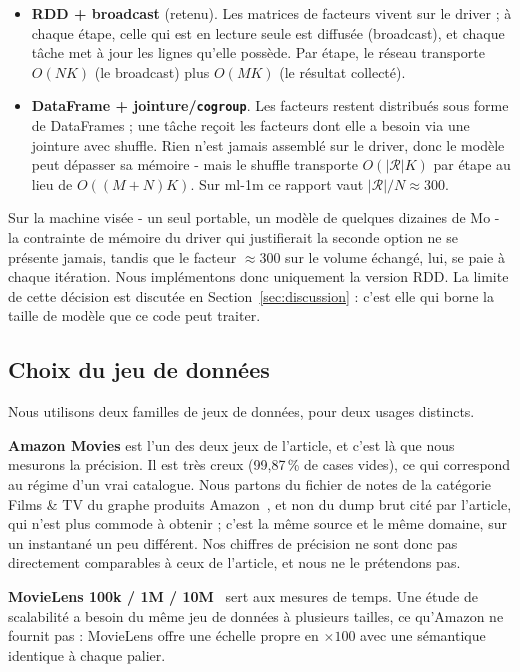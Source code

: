 \documentclass[11pt,a4paper]{article}
\begin{document}
\begin{itemize}\itemsep2pt
\item \textbf{RDD + broadcast} (retenu). Les matrices de facteurs vivent sur le driver ;
à chaque étape, celle qui est en lecture seule est diffusée (broadcast), et chaque tâche
met à jour les lignes qu'elle possède. Par étape, le réseau transporte $O(NK)$ (le
broadcast) plus $O(MK)$ (le résultat collecté).
\item \textbf{DataFrame + jointure/\texttt{cogroup}}. Les
facteurs restent distribués sous forme de DataFrames ; une tâche reçoit les facteurs
dont elle a besoin via une jointure avec shuffle. Rien n'est jamais assemblé sur le
driver, donc le modèle peut dépasser sa mémoire - mais le shuffle transporte
$O(|\mathcal{R}|K)$ par étape au lieu de $O((M+N)K)$. Sur ml-1m ce rapport vaut
$|\mathcal{R}|/N \approx 300$.
\end{itemize}

Sur la machine visée - un seul portable, un modèle de quelques dizaines de Mo - la
contrainte de mémoire du driver qui justifierait la seconde option ne se présente
jamais, tandis que le facteur $\approx 300$ sur le volume échangé, lui, se paie à chaque
itération. Nous implémentons donc uniquement la version RDD. La limite de cette
décision est discutée en Section~\ref{sec:discussion} : c'est elle qui borne la taille
de modèle que ce code peut traiter.

\subsection{Choix du jeu de données}\label{sec:dataset}

Nous utilisons deux familles de jeux de données, pour deux usages distincts.

\textbf{Amazon Movies} est l'un des deux jeux de l'article, et c'est là que nous
mesurons la précision. Il est très creux (99,87\,\% de cases vides), ce qui correspond
au régime d'un vrai catalogue. Nous partons du fichier de notes de la catégorie
Films \& TV du graphe produits Amazon~\cite{mcauley2015amazon}, et non du dump brut cité
par l'article, qui n'est plus commode à obtenir ; c'est la même source et le même
domaine, sur un instantané un peu différent. Nos chiffres de précision ne sont donc pas
directement comparables à ceux de l'article, et nous ne le prétendons pas.

\textbf{MovieLens 100k / 1M / 10M}~\cite{harper2015movielens} sert aux mesures de temps. Une étude de scalabilité
a besoin du même jeu de données à plusieurs tailles, ce qu'Amazon ne fournit pas :
MovieLens offre une échelle propre en $\times100$ avec une sémantique identique à chaque
palier.
\end{document}
